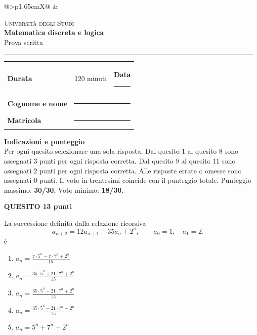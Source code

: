 \documentclass[11pt,a4paper]{article}
\newcommand{\quesito}[2]{%
    \par\addvspace{0.55em}%
    \noindent\colorbox{examPale}{%
        \parbox{\dimexpr\linewidth-2\fboxsep\relax}{%
            \color{examNavy}\textbf{QUESITO #1}\hfill\textbf{#2 punti}}}%
    \par\nobreak\vspace{0.15em}%
}
\begin{document}
\begin{center}
    \begin{tabularx}{\linewidth}{@{}>{\centering\arraybackslash}p{1.65cm}X@{}}
        &
        {\raggedright
            {\small\scshape Universit\`a degli Studi}\\[0.2em]
            {\LARGE\bfseries\color{examNavy} Matematica discreta e logica}\\[0.15em]
            {\large Prova scritta}}
    \end{tabularx}
    \vspace{0.45em}
    {\color{examGold}\rule{\linewidth}{1.1pt}}
\end{center}

\vspace{0.2em}
\begin{tabularx}{\linewidth}{@{}lXr@{}}
    \textbf{Durata} & 120 minuti & \textbf{Data} \rule{2.8cm}{0.4pt}\\[0.8em]
    \textbf{Cognome e nome} & \multicolumn{2}{l}{\rule{12cm}{0.4pt}}\\[0.8em]
    \textbf{Matricola} & \multicolumn{2}{l}{\rule{5cm}{0.4pt}}
\end{tabularx}

\vspace{0.6em}
\colorbox{examPale}{%
    \parbox{\dimexpr\linewidth-2\fboxsep\relax}{%
        \textbf{\color{examNavy}Indicazioni e punteggio}\\[-0.1em]
        Per ogni quesito selezionare una sola risposta.
        Dal quesito 1 al quesito 8 sono assegnati 3 punti per ogni risposta
        corretta. Dal quesito 9 al quesito 11 sono assegnati 2 punti per ogni
        risposta corretta. Alle risposte errate o omesse sono assegnati 0 punti.
        Il voto in trentesimi coincide con il punteggio totale.
        Punteggio massimo: \textbf{30/30}. Voto minimo: \textbf{18/30}.}}

\begin{samepage}
\quesito{1}{3}
La successione definita dalla relazione ricorsiva
\[
    a_{n+2}=12a_{n+1}-35a_n+2^n,
    \qquad a_0=1,\quad a_1=2,
\]
\`e
\begin{enumerate}
    \item $\displaystyle a_n=\frac{7\cdot5^n-7\cdot7^n+2^n}{15}$
    \item $\displaystyle a_n=\frac{35\cdot5^n+21\cdot7^n+2^n}{15}$
    \item $\displaystyle a_n=\frac{35\cdot5^n-21\cdot7^n+2^n}{15}$
    \item $\displaystyle a_n=\frac{35\cdot5^n-21\cdot7^n-2^n}{15}$
    \item $\displaystyle a_n=5^n+7^n+2^n$
\end{enumerate}
\end{samepage}
\end{document}
